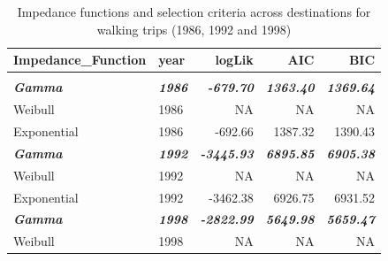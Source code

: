 \documentclass[
11pt, %
oneside, %
english, %
singlespacing, %
]{macthesis} %
\begin{document}
\begin{table}
\centering
\caption{\label{tab:ch03-make-table-04}\label{tab:ch03-table-04}Impedance functions and selection criteria across destinations for walking trips (1986, 1992 and 1998)}
\centering
\fontsize{12}{14}\selectfont
\begin{tabular}[t]{llrrr}
\toprule
Impedance\_Function & year & logLik & AIC & BIC\\
\midrule
\addlinespace[0.3em]
\multicolumn{5}{l}{\textbf{Destination: Home}}\\
\begingroup\fontsize{10}{12}\selectfont \em{\textbf{\hspace{1em}Gamma}}\endgroup & \begingroup\fontsize{10}{12}\selectfont \em{\textbf{1986}}\endgroup & \begingroup\fontsize{10}{12}\selectfont \em{\textbf{-679.70}}\endgroup & \begingroup\fontsize{10}{12}\selectfont \em{\textbf{1363.40}}\endgroup & \begingroup\fontsize{10}{12}\selectfont \em{\textbf{1369.64}}\endgroup\\
\hspace{1em}Weibull & 1986 & NA & NA & \vphantom{2} NA\\
\hspace{1em}Exponential & 1986 & -692.66 & 1387.32 & 1390.43\\
\begingroup\fontsize{10}{12}\selectfont \em{\textbf{\hspace{1em}Gamma}}\endgroup & \begingroup\fontsize{10}{12}\selectfont \em{\textbf{1992}}\endgroup & \begingroup\fontsize{10}{12}\selectfont \em{\textbf{-3445.93}}\endgroup & \begingroup\fontsize{10}{12}\selectfont \em{\textbf{6895.85}}\endgroup & \begingroup\fontsize{10}{12}\selectfont \em{\textbf{6905.38}}\endgroup\\
\hspace{1em}Weibull & 1992 & NA & NA & \vphantom{1} NA\\
\hspace{1em}Exponential & 1992 & -3462.38 & 6926.75 & 6931.52\\
\begingroup\fontsize{10}{12}\selectfont \em{\textbf{\hspace{1em}Gamma}}\endgroup & \begingroup\fontsize{10}{12}\selectfont \em{\textbf{1998}}\endgroup & \begingroup\fontsize{10}{12}\selectfont \em{\textbf{-2822.99}}\endgroup & \begingroup\fontsize{10}{12}\selectfont \em{\textbf{5649.98}}\endgroup & \begingroup\fontsize{10}{12}\selectfont \em{\textbf{5659.47}}\endgroup\\
\hspace{1em}Weibull & 1998 & NA & NA & \vphantom{1} NA\\

\end{tabular}
\end{table}
\end{document}

